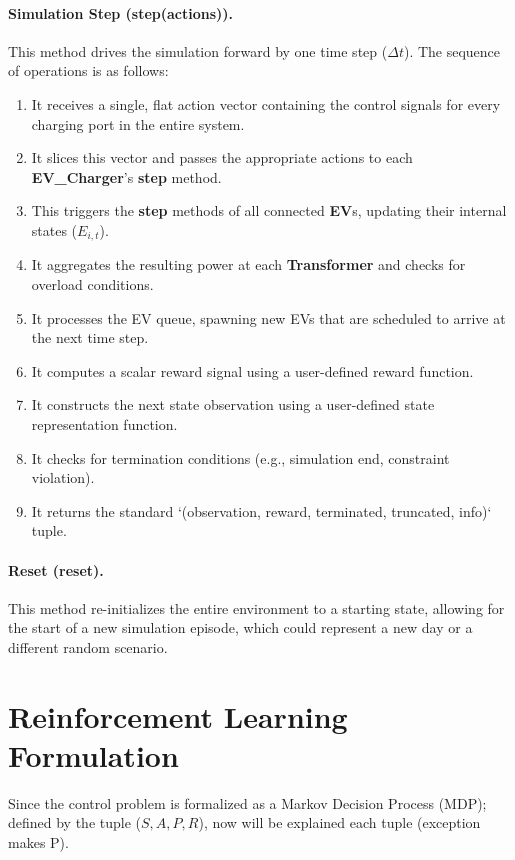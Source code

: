 \paragraph{Simulation Step (\textbf{step(actions)}).} This method drives the simulation forward by one time step ($\Delta t$). The sequence of operations is as follows:
\begin{enumerate}
    \item It receives a single, flat action vector containing the control signals for every charging port in the entire system.
    \item It slices this vector and passes the appropriate actions to each \textbf{EV\_Charger}'s \textbf{step} method.
    \item This triggers the \textbf{step} methods of all connected \textbf{EV}s, updating their internal states ($E_{i,t}$).
    \item It aggregates the resulting power at each \textbf{Transformer} and checks for overload conditions.
    \item It processes the EV queue, spawning new EVs that are scheduled to arrive at the next time step.
    \item It computes a scalar reward signal using a user-defined reward function.
    \item It constructs the next state observation using a user-defined state representation function.
    \item It checks for termination conditions (e.g., simulation end, constraint violation).
    \item It returns the standard `(observation, reward, terminated, truncated, info)` tuple.
\end{enumerate}
\paragraph{Reset (\textbf{reset}).} This method re-initializes the entire environment to a starting state, allowing for the start of a new simulation episode, which could represent a new day or a different random scenario.







\section{Reinforcement Learning Formulation}
Since the control problem is formalized as a Markov Decision Process (MDP); defined by the tuple ($S, A, P, R$), now will be explained each tuple (exception makes P).

